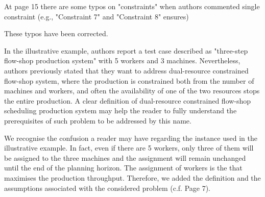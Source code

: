 \documentclass[preprint,11pt,3p]{elsarticle}
\begin{document}
\begin{tcolorbox}[colback=r_color1,colframe=r_color2,title=Response Q8  :]
			
\end{tcolorbox}
\begin{tcolorbox}[colback=q_color1,colframe=q_color2,title=Q9 :]	
	At page 15 there are some typos on "constraints" when authors commented single constraint (e.g., "Constraint 7" and "Constraint 8" ensures)
\end{tcolorbox}


\begin{tcolorbox}[colback=r_color1,colframe=r_color2,title=Response Q9 :]
	These typos have been corrected.
\end{tcolorbox}
\begin{tcolorbox}[colback=q_color1,colframe=q_color2,title=Q10  :]	
    In the illustrative example, authors report a test case described as "three-step flow-shop production system" with 5 workers and 3 machines. Nevertheless, authors previously stated that they want to address dual-resource constrained flow-shop system, where the production is constrained both from the number of machines and workers, and often the availability of one of the two resources stops the entire production. A clear definition of dual-resource constrained flow-shop scheduling production system may help the reader to fully understand the prerequisites of such problem to be addressed by this name.	    
\end{tcolorbox}
\begin{tcolorbox}[colback=r_color1,colframe=r_color2,title=Response Q10 :]
    We recognise the confusion a reader may have regarding the instance used in the illustrative example. In fact, even if there are 5 workers, only three of them will be assigned to the three machines and the assignment will remain unchanged until the end of the planning horizon. The assignment of workers is the that maximises the production throughput.
    Therefore, we added the definition and the assumptions associated with the considered problem  (c.f. Page 7).
\end{tcolorbox}
\end{document}
